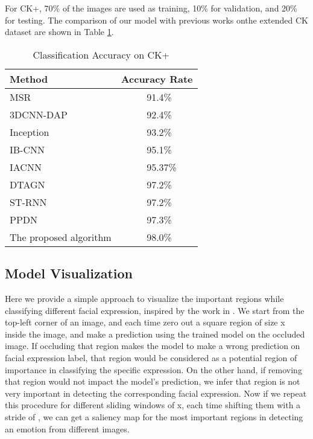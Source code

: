 \documentclass[conference]{IEEEtran}
\begin{document}
For CK+, 70\% of the images are used as training, 10\% for validation, and 20\% for testing.
The comparison of our model with previous works onthe extended CK dataset are shown in Table \ref{table:CK}.
\begin{table}[h]
\centering
  \caption{Classification Accuracy on CK+}
\begin{tabular}{|m{4cm}|c|}
\hline
Method  & Accuracy Rate\\
\hline
MSR \cite{MSR}   &  \ 91.4\%\\
\hline 
3DCNN-DAP \cite{3DCNN} &   \  92.4\% \\
\hline 
Inception \cite{mollahosseini2016going} &   \  93.2\% \\
\hline 
IB-CNN \cite{IBCNN} &   \  95.1\% \\
\hline 
IACNN \cite{IACNN} &   \  \ 95.37\% \\
\hline
DTAGN \cite{DTAGN} &   \  97.2\% \\
\hline
ST-RNN \cite{STRNN} &   \  97.2\% \\
\hline
PPDN \cite{PPDN} & \ 97.3\% \\
\hline
 The proposed algorithm  &  \ 98.0\%\\
\hline
\end{tabular}
\label{table:CK}
\end{table}



\subsection{Model Visualization}
Here we provide a simple approach to visualize the important regions while classifying different facial expression, inspired by the work in \cite{fergus}. 
We start from the top-left corner of an image, and each time zero out a square region of size x inside the image, and make a prediction using the trained model on the occluded image.
If occluding that region makes the model to make a wrong prediction on facial expression label, that region would be considered as a potential region of importance in classifying the specific expression. 
On the other hand, if removing that region would not impact the model's prediction, we infer that region is not very important in detecting the corresponding facial expression.
Now if we repeat this procedure for different sliding windows of x, each time shifting them with a stride of , we can get a saliency map for the most important regions in detecting an emotion from different images.
\end{document}
